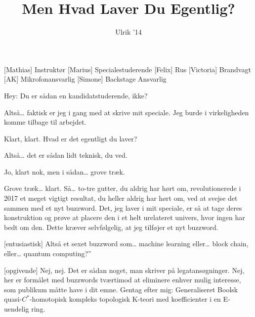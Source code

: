 \documentclass[a4paper,11pt]{article}
\title{Men Hvad Laver Du Egentlig?}
\author{Ulrik '14}
\begin{document}
\maketitle

\begin{roles}
[Mathias] Instruktør
[Marius]  Specialestuderende
[Felix] Rus
[Victoria] Brandvagt
[AK] Mikrofonansvarlig
[Simone] Backstage Ansvarlig
\end{roles}

\begin{sketch}



 Hey: Du er sådan en kandidatstuderende, ikke?

 Altså… faktisk er jeg i gang med at skrive mit speciale. Jeg burde i virkeligheden komme tilbage til arbejdet.


 Klart, klart. Hvad er det egentligt du laver?


 Altså… det er sådan lidt teknisk, du ved.

 Jo, klart nok, men i sådan… grove træk.


 Grove træk… klart. Så… to-tre gutter, du aldrig har hørt om, revolutionerede i 2017 et meget vigtigt resultat, du heller aldrig har hørt om, ved at svejse det sammen med et nyt buzzword. Det, jeg laver i mit speciale, er så at tage deres konstruktion og prøve at placere den i et helt urelateret univers, hvor ingen har bedt om den. Dette kræver selvfølgelig, at jeg tilføjer et nyt buzzword.

[entusiastisk] Altså et sexet buzzword som… machine learning eller… block chain, eller… quantum computing?”

[opgivende] Nej, nej. Det er sådan noget, man skriver på legatansøgninger. Nej, her er formålet med buzzwords tværtimod at eliminere enhver mulig interesse, som publikum måtte have i dit emne. Gentag efter mig: Generaliseret Boolsk quasi-$C^*$-homotopisk kompleks topologisk K-teori med koefficienter i en E-uendelig ring.


\end{sketch}
\end{document}
